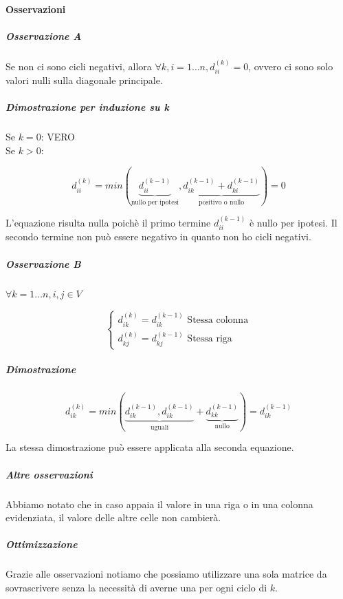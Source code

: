 \documentclass[tikz]{article}
\let\oldparagraph\paragraph
\renewcommand{\paragraph}[1]{\oldparagraph{#1}\mbox{}}
\let\oldsubparagraph\subparagraph
\renewcommand{\subparagraph}[1]{\oldsubparagraph{#1}\mbox{}}
\begin{document}
{{\paragraph{Osservazioni}

\subparagraph{Osservazione A}

Se non ci sono cicli negativi, allora $\forall k,i = 1\ldots n, d_{ii}^{(k)} = 0$, ovvero ci sono solo valori nulli sulla diagonale principale.

\subparagraph{Dimostrazione per induzione su k}

Se $k=0$: VERO \\ 
Se $k>0$: 

\begin{equation}
d_{ii}^{(k)} = min( \underbrace{d_{ii}^{(k-1)}}_\text{nullo per ipotesi} ,  \underbrace{d_{ik}^{(k-1)} + d_{ki}^{(k-1)}}_\text{positivo o nullo} ) = 0
\end{equation}

L'equazione risulta nulla poichè il primo termine $d_{ii}^{(k-1)}$ è nullo per ipotesi.
Il secondo termine non può essere negativo in quanto non ho cicli negativi.


\subparagraph{Osservazione B}

$\forall k = 1\ldots n,i,j \in V$

\[
\begin{cases} d_{ik}^{(k)} = d_{ik}^{(k-1)} \mbox{ Stessa colonna} \\ d_{kj}^{(k)} = d_{kj}^{(k-1)} \mbox{ Stessa riga} \end{cases}
\]


\subparagraph{Dimostrazione}

\begin{equation}
d_{ik}^{(k)} = min(  \underbrace{ d_{ik}^{(k-1)} , d_{ik}^{(k-1)}  }_\text{uguali} + \underbrace{ d_{kk}^{(k-1)} }_\text{nullo} ) = d_{ik}^{(k-1)}
\end{equation}

La stessa dimostrazione può essere applicata alla seconda equazione.

\subparagraph{Altre osservazioni}
Abbiamo notato che in caso appaia il valore \infty in una riga o in una colonna evidenziata, il valore delle altre celle non cambierà.


\subparagraph{Ottimizzazione}

Grazie alle osservazioni notiamo che possiamo utilizzare una sola matrice da sovrascrivere senza la necessità di averne una per ogni ciclo di $k$.




}}
\end{document}
